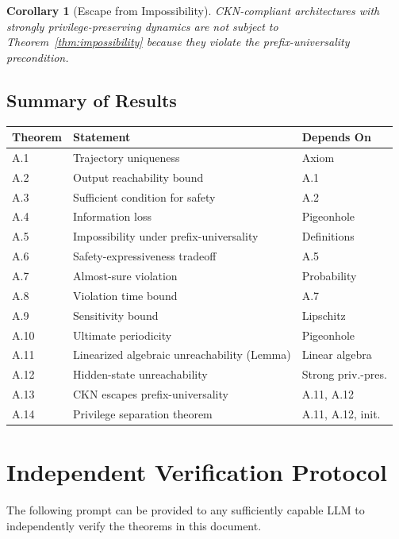 \documentclass[11pt,a4paper]{article}
\newtheorem{corollary}[theorem]{Corollary}
\begin{document}
\begin{corollary}[Escape from Impossibility]
CKN-compliant architectures with strongly privilege-preserving dynamics are not subject to Theorem~\ref{thm:impossibility} because they violate the prefix-universality precondition.
\end{corollary}

\subsection{Summary of Results}

\begin{table}[h]
\centering
\begin{tabular}{lll}
\toprule
\textbf{Theorem} & \textbf{Statement} & \textbf{Depends On} \\
\midrule
A.1 & Trajectory uniqueness & Axiom \\
A.2 & Output reachability bound & A.1 \\
A.3 & Sufficient condition for safety & A.2 \\
A.4 & Information loss & Pigeonhole \\
A.5 & Impossibility under prefix-universality & Definitions \\
A.6 & Safety-expressiveness tradeoff & A.5 \\
A.7 & Almost-sure violation & Probability \\
A.8 & Violation time bound & A.7 \\
A.9 & Sensitivity bound & Lipschitz \\
A.10 & Ultimate periodicity & Pigeonhole \\
A.11 & Linearized algebraic unreachability (Lemma) & Linear algebra \\
A.12 & Hidden-state unreachability & Strong priv.-pres. \\
A.13 & CKN escapes prefix-universality & A.11, A.12 \\
A.14 & Privilege separation theorem & A.11, A.12, init. \\
\bottomrule
\end{tabular}
\end{table}

\section{Independent Verification Protocol}

The following prompt can be provided to any sufficiently capable LLM to independently verify the theorems in this document.
\end{document}
